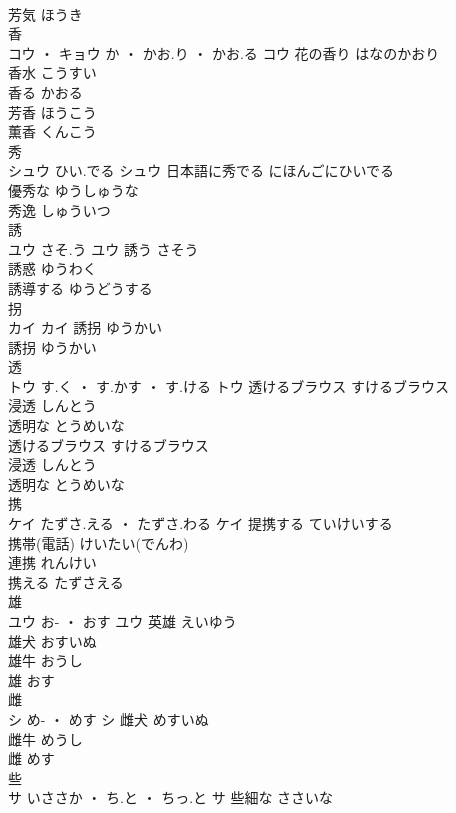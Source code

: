 \documentclass[8pt]{extreport}
\begin{document}
\begin{CJK}{UTF8}{min}
\\	芳気	ほうき	
\\	香	
\\	コウ ・ キョウ	か ・ かお.り ・ かお.る	コウ	花の香り	はなのかおり	
\\	香水	こうすい	
\\	香る	かおる	
\\	芳香	ほうこう	
\\	薫香	くんこう	
\\	秀	
\\	シュウ	ひい.でる	シュウ	日本語に秀でる	にほんごにひいでる	
\\	優秀な	ゆうしゅうな	
\\	秀逸	しゅういつ	
\\	誘	
\\	ユウ	さそ.う	ユウ	誘う	さそう	
\\	誘惑	ゆうわく	
\\	誘導する	ゆうどうする	
\\	拐	
\\	カイ		カイ	誘拐	ゆうかい	
\\	誘拐	ゆうかい	
\\	透	
\\	トウ	す.く ・ す.かす ・ す.ける	トウ	透けるブラウス	すけるブラウス	
\\	浸透	しんとう	
\\	透明な	とうめいな	
\\	透けるブラウス	すけるブラウス	
\\	浸透	しんとう	
\\	透明な	とうめいな	
\\	携	
\\	ケイ	たずさ.える ・ たずさ.わる	ケイ	提携する	ていけいする	
\\	携帯(電話)	けいたい(でんわ)	
\\	連携	れんけい	
\\	携える	たずさえる	
\\	雄	
\\	ユウ	お- ・ おす	ユウ	英雄	えいゆう	
\\	雄犬	おすいぬ	
\\	雄牛	おうし	
\\	雄	おす	
\\	雌	
\\	シ	め- ・ めす	シ	雌犬	めすいぬ	
\\	雌牛	めうし	
\\	雌	めす	
\\	些	
\\	サ	いささか ・ ち.と ・ ちっ.と	サ	些細な	ささいな	

\end{CJK}
\end{document}

